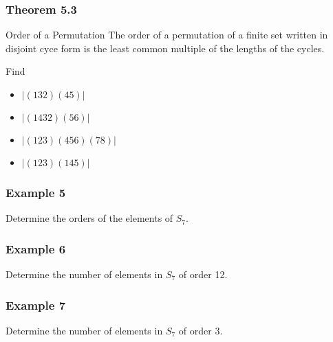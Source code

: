 \documentclass{beamer}
\begin{document}
\begin{frame}
    \frametitle{Theorem 5.3}

    \begin{block}{Order of a Permutation}
        The order of a permutation of a finite set written in disjoint cyce form is the least common multiple of the lengths of the cycles. 
    \end{block}\pause

\vspace{0.2in}
    Find \begin{itemize}
        \item \(|(132)(45)|\)
        \item \(|(1432)(56)|\)
        \item \(|(123)(456)(78)|\)
        \item \(|(123)(145)|\)
    \end{itemize}

\end{frame}

\begin{frame}
    \frametitle{Example 5}

    Determine the orders of the elements of \(S_7\). 

\end{frame}

\begin{frame}
    \frametitle{Example 6}

    Determine the number of elements in \(S_7\) of order 12. 

\end{frame}

\begin{frame}
    \frametitle{Example 7}

    Determine the number of elements in \(S_7\) of order \(3\). 

\end{frame}
\end{document}
